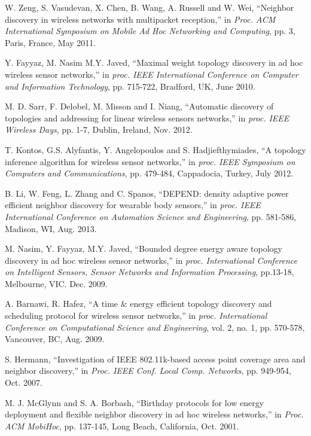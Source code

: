 \documentclass[10pt,english,two column]{IEEEtran}
\begin{document}
\begin{thebibliography}{10}
W. Zeng, S. Vasudevan, X. Chen, B. Wang, A. Russell
and W. Wei, ``Neighbor discovery in wireless networks with multipacket
reception,'' in \textit{Proc. ACM International Symposium on Mobile
Ad Hoc Networking and Computing}, pp. 3, Paris, France, May 2011.

Y. Fayyaz, M. Nasim M.Y. Javed, ``Maximal weight
topology discovery in ad hoc wireless sensor networks,'' in \textit{proc.
IEEE International Conference on Computer and Information Technology},
pp. 715-722, Bradford, UK, June 2010.

M. D. Sarr, F. Delobel, M. Misson and I. Niang, ``Automatic
discovery of topologies and addressing for linear wireless sensors
networks,'' in \textit{proc. IEEE Wireless Days}, pp. 1-7, Dublin,
Ireland, Nov. 2012.

T. Kontos, G.S. Alyfantis, Y. Angelopoulos and S.
Hadjiefthymiades, ``A topology inference algorithm for wireless sensor
networks,'' in\textit{ proc. IEEE Symposium on Computers and Communications},
pp. 479-484, Cappadocia, Turkey, July 2012.

B. Li, W. Feng, L. Zhang and C. Spanos, ``DEPEND: density
adaptive power efficient neighbor discovery for wearable body sensors,''
in \textit{proc. IEEE International Conference on Automation Science
and Engineering}, pp. 581-586, Madison, WI, Aug. 2013.

M. Nasim, Y. Fayyaz, M.Y. Javed, ``Bounded degree
energy aware topology discovery in ad hoc wireless sensor networks,''
in \textit{proc. International Conference on Intelligent Sensors,
Sensor Networks and Information Processing}, pp.13-18, Melbourne,
VIC. Dec. 2009.

A. Barnawi, R. Hafez, ``A time \& energy efficient
topology discovery and scheduling protocol for wireless sensor networks,''
in \textit{proc. International Conference on Computational Science
and Engineering}, vol. 2, no. 1, pp. 570-578, Vancouver, BC, Aug.
2009.

S. Hermann, ``Investigation of IEEE 802.11k-based
access point coverage area and neighbor discovery,'' in \textit{Proc.
IEEE Conf. Local Comp. Networks}, pp. 949-954, Oct. 2007. 

M. J. McGlynn and S. A. Borbash, \textquotedblleft Birthday
protocols for low energy deployment and flexible neighbor discovery
in ad hoc wireless networks,\textquotedblright{} in \textit{Proc.
ACM MobiHoc}, pp. 137-145, Long Beach, California, Oct. 2001.


\end{thebibliography}
\end{document}

